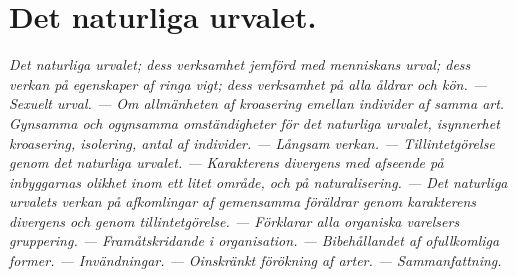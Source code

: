 

\chapter{Det naturliga urvalet.}
{\it
Det naturliga urvalet; dess verksamhet jemförd med menniskans urval; dess verkan på egenskaper af ringa vigt; dess verksamhet på alla åldrar och kön. — Sexuelt urval. — Om allmänheten af kroasering emellan individer af samma art. Gynsamma och ogynsamma omständigheter för det naturliga urvalet, isynnerhet kroasering, isolering, antal af individer. — Långsam verkan. — Tillintetgörelse genom det naturliga urvalet. — Karakterens divergens med afseende på inbyggarnas olikhet inom ett litet område, och på naturalisering. — Det naturliga urvalets verkan på afkomlingar af gemensamma föräldrar genom karakterens divergens och genom tillintetgörelse. — Förklarar alla organiska varelsers gruppering. — Framåtskridande i organisation. — Bibehållandet af ofullkomliga former. — Invändningar. — Oinskränkt förökning af arter. — Sammanfattning.
}\\[0.5cm]

